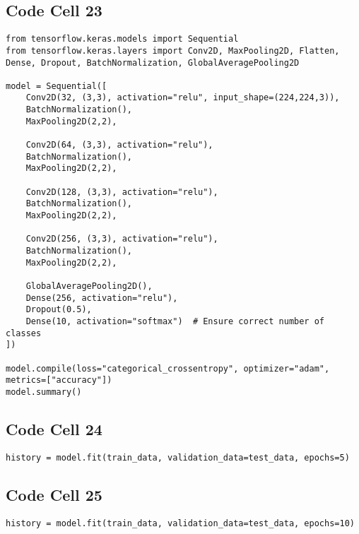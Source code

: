 \documentclass{article}
\begin{document}
\subsection*{Code Cell 23}
\begin{lstlisting}
from tensorflow.keras.models import Sequential
from tensorflow.keras.layers import Conv2D, MaxPooling2D, Flatten, Dense, Dropout, BatchNormalization, GlobalAveragePooling2D

model = Sequential([
    Conv2D(32, (3,3), activation="relu", input_shape=(224,224,3)),
    BatchNormalization(),
    MaxPooling2D(2,2),

    Conv2D(64, (3,3), activation="relu"),
    BatchNormalization(),
    MaxPooling2D(2,2),

    Conv2D(128, (3,3), activation="relu"),
    BatchNormalization(),
    MaxPooling2D(2,2),

    Conv2D(256, (3,3), activation="relu"),
    BatchNormalization(),
    MaxPooling2D(2,2),

    GlobalAveragePooling2D(),
    Dense(256, activation="relu"),
    Dropout(0.5),
    Dense(10, activation="softmax")  # Ensure correct number of classes
])

model.compile(loss="categorical_crossentropy", optimizer="adam", metrics=["accuracy"])
model.summary()

\end{lstlisting}

\subsection*{Code Cell 24}
\begin{lstlisting}
history = model.fit(train_data, validation_data=test_data, epochs=5)
\end{lstlisting}

\subsection*{Code Cell 25}
\begin{lstlisting}
history = model.fit(train_data, validation_data=test_data, epochs=10)
\end{lstlisting}
\end{document}
